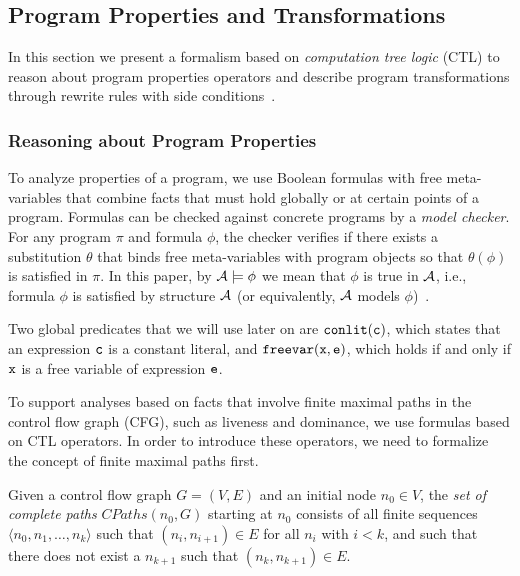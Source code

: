 \subsection{Program Properties and Transformations}

In this section we present a formalism based on {\em computation tree logic} (CTL) to reason about program properties operators and describe program transformations through rewrite rules with side conditions~\cite{Clarke86,Lacey04,Kalvala09}.

\subsubsection*{Reasoning about Program Properties}

To analyze properties of a program, we use Boolean formulas with free meta-variables that combine facts that must hold globally or at certain points of a program. Formulas can be checked against concrete programs by a {\em model checker}. For any program $\pi$ and formula $\phi$, the checker verifies if there exists a substitution $\theta$ that binds free meta-variables with program objects so that $\theta(\phi)$ is satisfied in $\pi$. 
In this paper, by $\cal{A}\models \phi$ we mean that $\phi$ is true in $\cal{A}$, i.e., formula $\phi$ is satisfied by structure $\cal{A}$ (or equivalently, $\cal{A}$ models $\phi$)~\cite{Clarke86}. %

Two global predicates that we will use later on are ${\tt conlit}(\text{${\tt c}$})$, which states that an expression $\text{${\tt c}$}$ is a constant literal, and ${\tt freevar}(\text{${\tt x}$},\text{${\tt e}$})$, which holds if and only if $\text{${\tt x}$}$ is a free variable of expression $\text{${\tt e}$}$.

To support analyses based on facts that involve finite maximal paths in the control flow graph (CFG), such as liveness and dominance, we use formulas based on CTL operators. In order to introduce these operators, we need to formalize the concept of finite maximal paths first.

\begin{definition} Given a control flow graph $G=(V,E)$ and an initial node $n_0\in V$, the {\em set of complete paths} $CPaths(n_0,G)$ starting at $n_0$ consists of all finite sequences $\langle n_0,n_1,\ldots,n_k\rangle$ such that $(n_i,n_{i+1})\in E$ for all $n_i$ with $i<k$, and such that there does not exist a $n_{k+1}$ such that $(n_k,n_{k+1})\in E$.
\end{definition}

